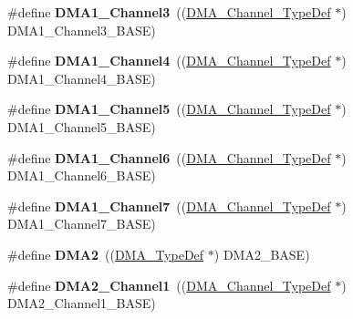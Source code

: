 \begin{DoxyCompactItemize}
\item 
\hypertarget{group___peripheral__declaration_gacf7b6093a37b306d7f1f50b2f200f0d0}{\#define {\bfseries D\-M\-A1\-\_\-\-Channel3}~((\hyperlink{struct_d_m_a___channel___type_def}{D\-M\-A\-\_\-\-Channel\-\_\-\-Type\-Def} $\ast$) D\-M\-A1\-\_\-\-Channel3\-\_\-\-B\-A\-S\-E)}\label{group___peripheral__declaration_gacf7b6093a37b306d7f1f50b2f200f0d0}

\item 
\hypertarget{group___peripheral__declaration_gad2c42743316bf64da557130061b1f56a}{\#define {\bfseries D\-M\-A1\-\_\-\-Channel4}~((\hyperlink{struct_d_m_a___channel___type_def}{D\-M\-A\-\_\-\-Channel\-\_\-\-Type\-Def} $\ast$) D\-M\-A1\-\_\-\-Channel4\-\_\-\-B\-A\-S\-E)}\label{group___peripheral__declaration_gad2c42743316bf64da557130061b1f56a}

\item 
\hypertarget{group___peripheral__declaration_ga06ff98ddef3c962795d2e2444004abff}{\#define {\bfseries D\-M\-A1\-\_\-\-Channel5}~((\hyperlink{struct_d_m_a___channel___type_def}{D\-M\-A\-\_\-\-Channel\-\_\-\-Type\-Def} $\ast$) D\-M\-A1\-\_\-\-Channel5\-\_\-\-B\-A\-S\-E)}\label{group___peripheral__declaration_ga06ff98ddef3c962795d2e2444004abff}

\item 
\hypertarget{group___peripheral__declaration_gac013c4376e4797831b5ddd2a09519df8}{\#define {\bfseries D\-M\-A1\-\_\-\-Channel6}~((\hyperlink{struct_d_m_a___channel___type_def}{D\-M\-A\-\_\-\-Channel\-\_\-\-Type\-Def} $\ast$) D\-M\-A1\-\_\-\-Channel6\-\_\-\-B\-A\-S\-E)}\label{group___peripheral__declaration_gac013c4376e4797831b5ddd2a09519df8}

\item 
\hypertarget{group___peripheral__declaration_ga4f9c23b3d1add93ed206b5c9afa5cda3}{\#define {\bfseries D\-M\-A1\-\_\-\-Channel7}~((\hyperlink{struct_d_m_a___channel___type_def}{D\-M\-A\-\_\-\-Channel\-\_\-\-Type\-Def} $\ast$) D\-M\-A1\-\_\-\-Channel7\-\_\-\-B\-A\-S\-E)}\label{group___peripheral__declaration_ga4f9c23b3d1add93ed206b5c9afa5cda3}

\item 
\hypertarget{group___peripheral__declaration_ga506520140eec1708bc7570c49bdf972d}{\#define {\bfseries D\-M\-A2}~((\hyperlink{struct_d_m_a___type_def}{D\-M\-A\-\_\-\-Type\-Def} $\ast$) D\-M\-A2\-\_\-\-B\-A\-S\-E)}\label{group___peripheral__declaration_ga506520140eec1708bc7570c49bdf972d}

\item 
\hypertarget{group___peripheral__declaration_gad86c75e1ff89e03e15570f47962865c8}{\#define {\bfseries D\-M\-A2\-\_\-\-Channel1}~((\hyperlink{struct_d_m_a___channel___type_def}{D\-M\-A\-\_\-\-Channel\-\_\-\-Type\-Def} $\ast$) D\-M\-A2\-\_\-\-Channel1\-\_\-\-B\-A\-S\-E)}\label{group___peripheral__declaration_gad86c75e1ff89e03e15570f47962865c8}


\end{DoxyCompactItemize}
